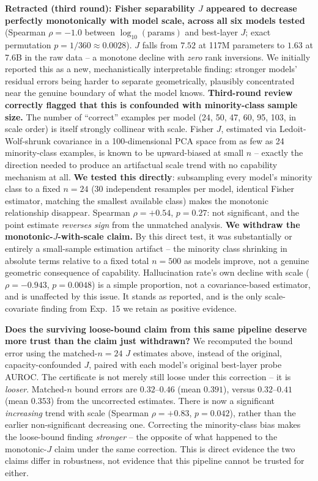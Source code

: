 \documentclass[onecolumn]{jmlr}
\begin{document}
\textbf{Retracted (third round): Fisher separability $J$ appeared to
decrease perfectly monotonically with model scale, across all six
models tested} (Spearman $\rho = -1.0$ between $\log_{10}(\text{params})$
and best-layer $J$; exact permutation $p = 1/360 \approx 0.0028$). $J$
falls from $7.52$ at 117M parameters to $1.63$ at 7.6B in the raw data
-- a monotone decline with \emph{zero} rank inversions. We initially
reported this as a new, mechanistically interpretable finding: stronger
models' residual errors being harder to separate geometrically,
plausibly concentrated near the genuine boundary of what the model
knows. \textbf{Third-round review correctly flagged that this is
confounded with minority-class sample size.} The number of ``correct''
examples per model (24, 50, 47, 60, 95, 103, in scale order) is itself
strongly collinear with scale. Fisher $J$, estimated via
Ledoit-Wolf-shrunk covariance in a 100-dimensional PCA space from as few
as 24 minority-class examples, is known to be upward-biased at small
$n$ -- exactly the direction needed to produce an artifactual scale
trend with no capability mechanism at all. \textbf{We tested this
directly}: subsampling every model's minority class to a fixed $n=24$
(30 independent resamples per model, identical Fisher estimator,
matching the smallest available class) makes the monotonic
relationship disappear. Spearman $\rho = +0.54$, $p = 0.27$: not
significant, and the point estimate \emph{reverses sign} from the
unmatched analysis. \textbf{We withdraw the monotonic-$J$-with-scale
claim.} By this direct test, it was substantially or entirely a
small-sample estimation artifact -- the minority class shrinking in
absolute terms relative to a fixed total $n=500$ as models improve, not
a genuine geometric consequence of capability. Hallucination rate's own
decline with scale ($\rho = -0.943$, $p = 0.0048$) is a simple
proportion, not a covariance-based estimator, and is unaffected by this
issue. It stands as reported, and is the only scale-covariate finding
from Exp.~15 we retain as positive evidence.

\textbf{Does the surviving loose-bound claim from this same pipeline
deserve more trust than the claim just withdrawn?} We recomputed the
bound error using the matched-$n{=}24$ $J$ estimates above, instead of
the original, capacity-confounded $J$, paired with each model's
original best-layer probe AUROC. The certificate is not merely still
loose under this correction -- it is \emph{looser}. Matched-$n$ bound
errors are $0.32$--$0.46$ (mean $0.391$), versus $0.32$--$0.41$ (mean
$0.353$) from the uncorrected estimates. There is now a significant
\emph{increasing} trend with scale (Spearman $\rho={+}0.83$,
$p=0.042$), rather than the earlier non-significant decreasing one.
Correcting the minority-class bias makes the loose-bound finding
\emph{stronger} -- the opposite of what happened to the monotonic-$J$
claim under the same correction. This is direct evidence the two claims
differ in robustness, not evidence that this pipeline cannot be trusted
for either.
\end{document}
